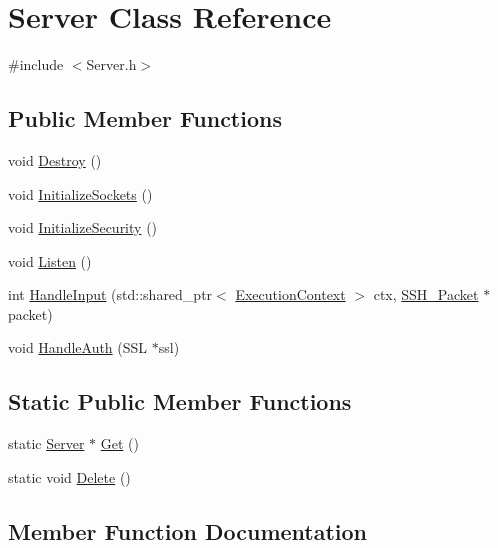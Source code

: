 \hypertarget{classServer}{}\section{Server Class Reference}
\label{classServer}


{\ttfamily \#include $<$Server.\+h$>$}

\subsection*{Public Member Functions}
\begin{DoxyCompactItemize}
\item 
void \hyperlink{classServer_ab11507d2655987863e93968a9c30199a}{Destroy} ()
\item 
void \hyperlink{classServer_a3a9c64284bac50fe3aef5f30c70ddac6}{Initialize\+Sockets} ()
\item 
void \hyperlink{classServer_acd6ee029b2df707ad9ff7d647b059d00}{Initialize\+Security} ()
\item 
void \hyperlink{classServer_afe47ec998069be828fb082e92836c05b}{Listen} ()
\item 
int \hyperlink{classServer_ab0df50e73f6737bb13869f725e8634c8}{Handle\+Input} (std\+::shared\+\_\+ptr$<$ \hyperlink{structExecutionContext}{Execution\+Context} $>$ ctx, \hyperlink{structSSH__Packet}{S\+S\+H\+\_\+\+Packet} $\ast$packet)
\item 
void \hyperlink{classServer_a88e6d1c3cb476d5c7627e9365b05da9a}{Handle\+Auth} (S\+SL $\ast$ssl)
\end{DoxyCompactItemize}
\subsection*{Static Public Member Functions}
\begin{DoxyCompactItemize}
\item 
static \hyperlink{classServer}{Server} $\ast$ \hyperlink{classServer_a68af2dda4c31e6dd178656d85ad21571}{Get} ()
\item 
static void \hyperlink{classServer_a3ca5015cd70a3f986c0045da3c9dc8ae}{Delete} ()
\end{DoxyCompactItemize}


\subsection{Member Function Documentation}
